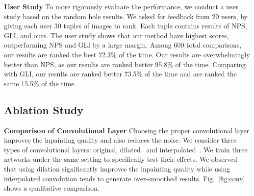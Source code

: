 \noindent\textbf{User Study}
To more rigorously evaluate the performance, we conduct a user study based on the random hole results. We asked for feedback from 20 users, by giving each user 30 tuples of images to rank. Each tuple contains results of NPS, GLI, and ours. The user study shows that our method have highest scores, outperforming NPS and GLI by a large margin. Among 600 total comparisons, our results are ranked the best 72.3\% of the time. Our results are overwhelmingly better than NPS, as our results are ranked better 95.8\% of the time. Comparing with GLI, our results are ranked better 73.5\% of the time and are ranked the same 15.5\% of the time. 

\subsection{Ablation Study}
\label{exp:study}

\noindent\textbf{Comparison of Convolutional Layer} Choosing the proper convolutional layer improves the inpainting quality and also reduces the noise. We consider three types of convolutional layers: original, dilated~\cite{yu2015multi} and interpolated~\cite{odena2016deconvolution}. We train three networks under the same setting to specifically test their effects. We observed that using dilation significantly improves the inpainting quality while using interpolated convolution tends to generate over-smoothed results. Fig.~\ref{fig:conv} shows a qualitative comparison. 

